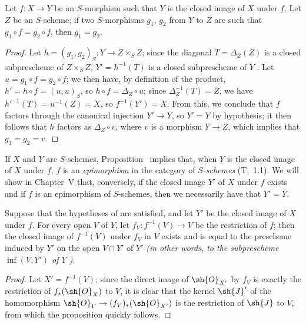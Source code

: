 \begin{corollary}[9.5.6]
\label{I.9.5.6}
Let $f:X\to Y$ be an $S$-morphism such that $Y$ is the closed image of $X$ under $f$.
Let $Z$ be an $S$-scheme; if two $S$-morphisms $g_1$, $g_2$ from $Y$ to $Z$ are such that $g_1\circ f=g_2\circ f$, then $g_1=g_2$.
\end{corollary}

\begin{proof}
Let $h=(g_1,g_2)_S:Y\to Z\times_S Z$; since the diagonal $T=\Delta_Z(Z)$ is a closed subprescheme of $Z\times_S Z$, $Y'=h^{-1}(T)$ is a closed subprescheme of $Y$ .
Let $u=g_1\circ f=g_2\circ f$; we then have, by definition of the product, $h'=h\circ f=(u,u)_S$, so $h\circ f=\Delta_Z\circ u$; since $\Delta_Z^{-1}(T)=Z$, we have $h'^{-1}(T)=u^{-1}(Z)=X$, so $f^{-1}(Y')=X$.
From this, we conclude  that $f$ factors through the canonical injection $Y'\to Y$, so $Y'=Y$ by hypothesis; it then follows  that $h$ factors as $\Delta_Z\circ v$, where $v$ is a morphism $Y\to Z$, which implies that $g_1=g_2=v$.
\end{proof}

\begin{remark}[9.5.7]
\label{I.9.5.7}
If $X$ and $Y$ are $S$-schemes, Proposition~ implies that,
when $Y$ is the closed image of $X$ under $f$, $f$ is an \emph{epimorphism} in the category of \emph{$S$-schemes} (T,~1.1).
We will show in Chapter~V that, conversely, if the closed image $Y'$ of $X$ under $f$ exists and if $f$ is an epimorphism of $S$-schemes, then we necessarily have that $Y'=Y$.
\end{remark}

\begin{proposition}[9.5.8]
\label{I.9.5.8}
Suppose that the hypotheses of  are satisfied, and let $Y'$ be the closed image of $X$ under $f$.
For every open $V$ of $Y$, let $f_V:f^{-1}(V)\to V$ be the restriction of $f$; then the closed image of $f^{-1}(V)$ under $f_V$ in $V$ exists and is equal to the prescheme induced by $Y'$ on the open $V\cap Y'$ of $Y'$ \emph{(in other words, to the subprescheme $\inf(V,Y')$ of $Y$ )}.
\end{proposition}

\begin{proof}
Let $X'=f^{-1}(V)$; since the direct image of $\sh{O}_{X'}$ by $f_V$ is exactly the restriction of $f_*(\sh{O}_X)$ to $V$, it is clear that the kernel $\sh{J}'$ of the homomorphism $\sh{O}_V\to(f_V)_*(\sh{O}_{X'})$ is the restriction of $\sh{J}$ to $V$, from which the proposition quickly follows.
\end{proof}

